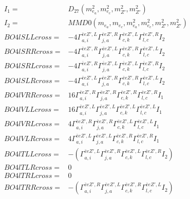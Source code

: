 \documentclass[A4,landscape]{article}
\begin{document}
\begin{align} 
I_1 = & D_{27}(m^2_{e_{{a}}}, m^2_{e_{{c}}}, m^2_{{Z'}}, m^2_{{Z'}}) \\ 
I_2 = & MMD0(m_{e_{{a}}}, m_{e_{{c}}}, m^2_{e_{{a}}}, m^2_{e_{{c}}}, m^2_{{Z'}}, m^2_{{Z'}}) \\ 
  BO4lSLLcross= & -4  \Gamma^{\bar{e}e {Z'} ,L}_{a, i} \Gamma^{\bar{e}e {Z'} ,R}_{j, a} \Gamma^{\bar{e}e {Z'} ,L}_{c, k} \Gamma^{\bar{e}e {Z'} ,R}_{l, c} I_2 \\ 
  BO4lSRRcross= & -4  \Gamma^{\bar{e}e {Z'} ,R}_{a, i} \Gamma^{\bar{e}e {Z'} ,L}_{j, a} \Gamma^{\bar{e}e {Z'} ,R}_{c, k} \Gamma^{\bar{e}e {Z'} ,L}_{l, c} I_2 \\ 
  BO4lSRLcross= & -4  \Gamma^{\bar{e}e {Z'} ,R}_{a, i} \Gamma^{\bar{e}e {Z'} ,L}_{j, a} \Gamma^{\bar{e}e {Z'} ,L}_{c, k} \Gamma^{\bar{e}e {Z'} ,R}_{l, c} I_2 \\ 
  BO4lSLRcross= & -4  \Gamma^{\bar{e}e {Z'} ,L}_{a, i} \Gamma^{\bar{e}e {Z'} ,R}_{j, a} \Gamma^{\bar{e}e {Z'} ,R}_{c, k} \Gamma^{\bar{e}e {Z'} ,L}_{l, c} I_2 \\ 
  BO4lVRRcross= & 16  \Gamma^{\bar{e}e {Z'} ,R}_{a, i} \Gamma^{\bar{e}e {Z'} ,R}_{j, a} \Gamma^{\bar{e}e {Z'} ,R}_{c, k} \Gamma^{\bar{e}e {Z'} ,R}_{l, c} I_1 \\ 
  BO4lVLLcross= & 16  \Gamma^{\bar{e}e {Z'} ,L}_{a, i} \Gamma^{\bar{e}e {Z'} ,L}_{j, a} \Gamma^{\bar{e}e {Z'} ,L}_{c, k} \Gamma^{\bar{e}e {Z'} ,L}_{l, c} I_1 \\ 
  BO4lVRLcross= & 4  \Gamma^{\bar{e}e {Z'} ,R}_{a, i} \Gamma^{\bar{e}e {Z'} ,R}_{j, a} \Gamma^{\bar{e}e {Z'} ,L}_{c, k} \Gamma^{\bar{e}e {Z'} ,L}_{l, c} I_1 \\ 
  BO4lVLRcross= & 4  \Gamma^{\bar{e}e {Z'} ,L}_{a, i} \Gamma^{\bar{e}e {Z'} ,L}_{j, a} \Gamma^{\bar{e}e {Z'} ,R}_{c, k} \Gamma^{\bar{e}e {Z'} ,R}_{l, c} I_1 \\ 
  BO4lTLLcross= & -( \Gamma^{\bar{e}e {Z'} ,L}_{a, i} \Gamma^{\bar{e}e {Z'} ,R}_{j, a} \Gamma^{\bar{e}e {Z'} ,L}_{c, k} \Gamma^{\bar{e}e {Z'} ,R}_{l, c} I_2) \\ 
  BO4lTLRcross= & 0 \\ 
  BO4lTRLcross= & 0 \\ 
  BO4lTRRcross= & -( \Gamma^{\bar{e}e {Z'} ,R}_{a, i} \Gamma^{\bar{e}e {Z'} ,L}_{j, a} \Gamma^{\bar{e}e {Z'} ,R}_{c, k} \Gamma^{\bar{e}e {Z'} ,L}_{l, c} I_2) \\ 
\end{align} 
\end{document}

